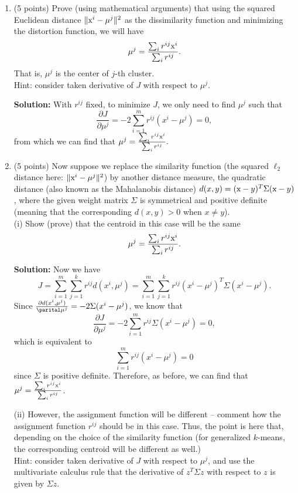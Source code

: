 \documentclass[twoside,10pt]{article}
\begin{document}
\begin{enumerate}

\item (5 points) Prove (using mathematical arguments) that using the squared Euclidean distance $\|\text x^i-\mu^j\|^2$ as the dissimilarity function and minimizing the distortion function, we will have 
   $$\mu^j=\frac{\sum_i r^{ij} \text x^i}{\sum_i r^{ij}}.$$
   That is, $\mu^j$ is the center of $j$-th cluster.  \\
   Hint: consider taken derivative of $J$ with respect to $\mu^j$.\\
   \begin{tcolorbox}
   \textbf{Solution:} With $r^{ij}$ fixed, to minimize $J$, we only need to find $\mu^j$ such that
   $$\frac{\partial{J}}{\partial{\mu^j}} = -2\sum_{i=1}^{m}r^{ij}(x^i-\mu^j) = 0,$$ 
   from which we can find that $\mu^j=\frac{\sum_i r^{ij} \text x^i}{\sum_i r^{ij}}.$  
   \end{tcolorbox}
   
   
   \item (5 points) Now suppose we replace the similarity function (the squared $\ell_2$ distance here: $\|\text x^i-\mu^j\|^2$) by another distance measure, the quadratic distance (also known as the Mahalanobis distance) $d(x, y) = (\text x - y)^T \Sigma  (\text x - y)$, where the given weight matrix $\Sigma$ is symmetrical and positive definite (meaning that the corresponding $d(x, y) > 0$ when $x \neq y$).\\
   (i) Show (prove) that the centroid in this case will be the same
   $$\mu^j=\frac{\sum_i r^{ij} \text x^i}{\sum_i r^{ij}}.$$
   \begin{tcolorbox}
   \textbf{Solution:} Now we have 
   $$J = \sum_{i=1}^m\sum_{j=1}^k r^{ij}d(x^i,\mu^j) = \sum_{i=1}^m\sum_{j=1}^k r^{ij}(x^i-\mu^j)^T\Sigma(x^i-\mu^j).$$ Since $\frac{\partial d(x^i,\mu^j)}{\parital\mu^j} = -2\Sigma(x^i-\mu^j)$, we know that
   $$\frac{\partial{J}}{\partial{\mu^j}} = -2\sum_{i=1}^{m}r^{ij}\Sigma(x^i-\mu^j) = 0,$$
   which is equivalent to $$\sum_{i=1}^{m}r^{ij}(x^i-\mu^j) = 0$$ since $\Sigma$ is positive definite. Therefore, as before, we can find that $\mu^j= \frac{\sum_i r^{ij} \text x^i}{\sum_i r^{ij}}$. 
   \end{tcolorbox}
   
   
   (ii) However, the assignment function will be different -- comment how the assignment function $r^{ij}$ should be in this case. 
   Thus, the point is here that, depending on the choice of the similarity function (for generalized $k$-means, the corresponding centroid will be different as well.) \\
   Hint: consider taken derivative of $J$ with respect to $\mu^j$, and use the multivariate calculus rule that the derivative of $z^T \Sigma z$ with respect to $z$ is given by $\Sigma z$. 
   

\end{enumerate}
\end{document}
